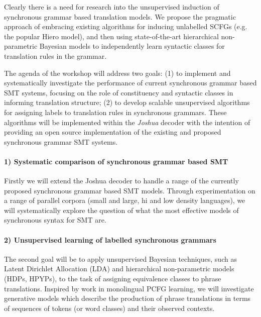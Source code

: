 \documentclass[11pt]{article}
\begin{document}
Clearly there is a need for research into the unsupervised induction of synchronous grammar based translation models.
We propose the pragmatic approach of embracing existing algorithms for inducing unlabelled SCFGs (e.g. the popular Hiero model), and then using state-of-the-art hierarchical non-parametric Bayesian models to independently learn syntactic classes for translation rules in the grammar.


The agenda of the workshop will address two goals: (1) to implement and systematically investigate the performance of current synchronous grammar based SMT systems, focusing on the role of constituency and syntactic classes in informing translation structure; (2) to develop scalable unsupervised algorithms for assigning labels to translation rules in synchronous grammars. 
These algorithms will be implemented within the {\em Joshua} decoder with the intention of providing an open source implementation of the existing and proposed synchronous grammar SMT systems.

\paragraph{1) Systematic comparison of synchronous grammar based SMT} 
Firstly we will extend the Joshua decoder to handle a range of the currently proposed synchronous grammar based SMT models.
Through experimentation on a range of parallel corpora (small and large, hi and low density languages), we will systematically explore the question of what the most effective models of synchronous syntax for SMT are.

\paragraph{2) Unsupervised learning of labelled synchronous grammars} 
The second goal will be to apply unsupervised Bayesian techniques, such as Latent Dirichlet Allocation (LDA) and hierarchical non-parametric models (HDPs, HPYPs), to the task of assigning equivalence classes to phrase translations.
Inspired by work in monolingual PCFG learning, we will investigate generative models which describe the production of phrase translations in terms of sequences of tokens (or word classes) and their observed contexts.
\end{document}
